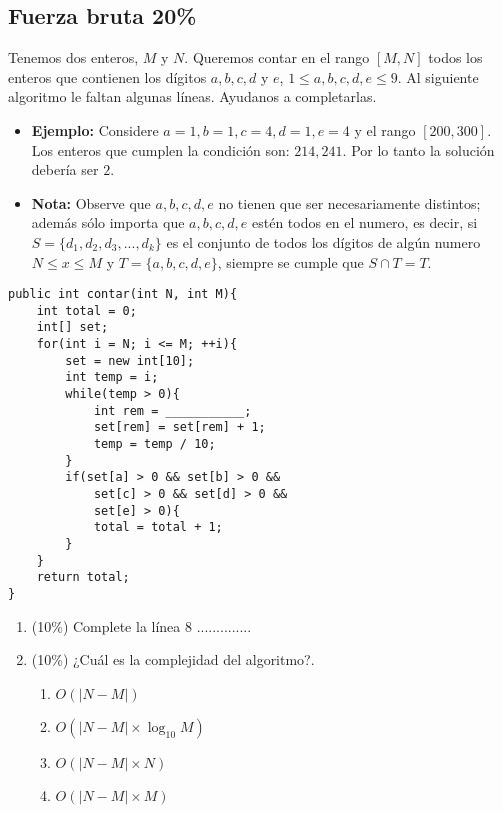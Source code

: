 \documentclass[10 pt]{article}
\begin{document}
\begin{multicols}{2}
\section{Fuerza bruta 20\%}
Tenemos dos enteros, $M$ y $N$. Queremos contar en el rango $[M, N]$ todos los enteros que contienen los dígitos $a, b, c, d$ y $e$, $1 \leq a, b, c, d, e \leq 9$. Al siguiente algoritmo le faltan algunas líneas. Ayudanos a completarlas.
\begin{itemize}
\item \textbf{Ejemplo: } Considere $a = 1, b = 1, c = 4, d = 1, e = 4$ y el rango $[200, 300]$. Los enteros que cumplen la condición son: $214, 241$. Por lo tanto la solución debería ser $2$. 
\item \textbf{Nota: } Observe que $a, b, c, d, e$ no tienen que ser necesariamente distintos; además sólo importa que $a, b, c, d, e$ estén todos en el numero, es decir, si $S = \{d_1,d_2,d_3, ..., d_k\}$ es el conjunto de todos los dígitos de algún numero $N \leq x \leq M$ y $T = \{a, b, c, d, e\}$, siempre se cumple que $S \cap T = T$.
\end{itemize}
\begin{lstlisting}
public int contar(int N, int M){
	int total = 0;
	int[] set;
	for(int i = N; i <= M; ++i){
		set = new int[10];		
		int temp = i;
		while(temp > 0){
			int rem = ___________;
			set[rem] = set[rem] + 1;
			temp = temp / 10;		
		} 
		if(set[a] > 0 && set[b] > 0 && 
			set[c] > 0 && set[d] > 0 && 
			set[e] > 0){
			total = total + 1;		
		}
	}
	return total;
}
\end{lstlisting} 
\begin{enumerate}[label=(\alph*)]
\item (10\%) Complete la línea 8 ..............
\item (10\%) ¿Cuál es la complejidad del algoritmo?.
\begin{enumerate}[label=(\roman*)]
\item $O(|N - M|)$
\item $O(|N - M| \times \log_{10} M)$
\item $O(|N - M| \times N)$
\item $O(|N - M| \times M)$
\end{enumerate}
\end{enumerate}



\end{multicols}
\end{document}
